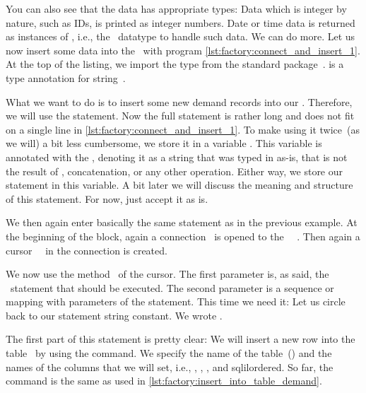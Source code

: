 You can also see that the data has appropriate types:
Data which is integer by nature, such as IDs, is printed as integer numbers.
Date or time data is returned as instances of , i.e., the \python\ datatype to handle such data.%
\FloatBarrier%
\endhsection%
%
%
%
%
%
%
We can do more.
Let us now insert some data into the \db\ with program \cref{lst:factory:connect_and_insert_1}.
At the top of the listing, we import the type  from the standard  package~\cite{PEP675}.
 is a type annotation for string~\emph{}.

What we want to do is to insert some new demand records into our \db.
Therefore, we will use the  statement.
Now the full  statement is rather long and does not fit on a single line in \cref{lst:factory:connect_and_insert_1}.
To make using it twice~(as we will) a bit less cumbersome, we store it in a variable .
This variable is annotated with the  , denoting it as a string that was typed in as-is, that is not the result of , concatenation, or any other operation.
Either way, we store our statement in this variable.
A bit later we will discuss the meaning and structure of this statement.
For now, just accept it as is.

We then again enter basically the same  statement as in the previous example.
At the beginning of the block, again a connection~ is opened to the \postgresql\ \dbms~\cite{VDGE2022PPDAFP:CC1}.
Then again a cursor~~\cite{VDGE2022PPDAFP:CC2} in the connection is created.
%
%
\begin{sloppypar}%
We now use the method~ of the cursor.
The first parameter is, as said, the \sql\ statement that should be executed.
The second parameter is a sequence or mapping with parameters of the statement.
This time we need it:
Let us circle back to our statement string constant.
We wrote .
\end{sloppypar}%
%
The first part of this statement is pretty clear:
We will insert a new row into the table~ by using the  command.
We specify the name of the table~() and the names of the columns that we will set, i.e., , , , and sqlil{ordered}.
So far, the command is the same as used in \cref{lst:factory:insert_into_table_demand}.

